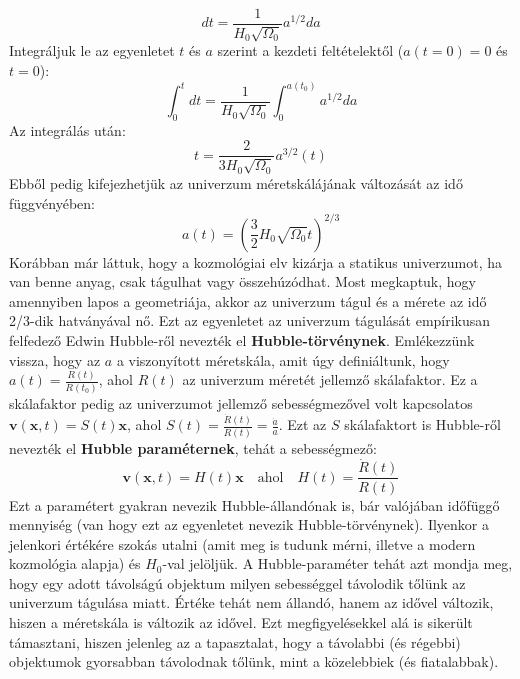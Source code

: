 \documentclass[../main.tex]{subfiles}
\begin{document}
\begin{equation}
    dt = \frac{1}{H_0 \sqrt{\Omega_0}} a^{1/2} d a
\end{equation}
Integráljuk le az egyenletet $t$ és $a$ szerint a kezdeti feltételektől ($a(t = 0) = 0$ és $t = 0$):
\begin{equation}
    \int_0^{t} d t = \frac{1}{H_0 \sqrt{\Omega_0}} \int_0^{a(t_0)} a^{1/2} d a
\end{equation}
Az integrálás után:
\begin{equation}
    t = \frac{2}{3 H_0 \sqrt{\Omega_0}} a^{3/2}(t)
\end{equation}
Ebből pedig kifejezhetjük az univerzum méretskálájának változását az idő függvényében:
\begin{equation}
    \boxed{a(t) = \left(\frac{3}{2} H_0 \sqrt{\Omega_0} t\right)^{2/3}}
\end{equation}
Korábban már láttuk, hogy a kozmológiai elv kizárja a statikus univerzumot, ha van benne anyag, csak tágulhat vagy összehúzódhat. Most megkaptuk, hogy amennyiben lapos a geometriája, akkor
az univerzum tágul és a mérete az idő 2/3-dik hatványával nő. Ezt az egyenletet az univerzum tágulását empírikusan felfedező Edwin Hubble-ről nevezték el \textbf{Hubble-törvénynek}. Emlékezzünk vissza,
hogy az $a$ a viszonyított méretskála, amit úgy definiáltunk, hogy $a(t) = \frac{R(t)}{R(t_0)}$, ahol $R(t)$ az univerzum méretét jellemző skálafaktor. Ez a skálafaktor pedig az univerzumot jellemző
sebességmezővel volt kapcsolatos $\mathbf{v}(\mathbf{x}, t) = S(t)\mathbf{x}$, ahol $S(t) = \frac{\dot{R}(t)}{R(t)} = \frac{\dot{a}}{a}$. Ezt az $S$ skálafaktort is Hubble-ről nevezték el \textbf{Hubble paraméternek}, tehát 
a sebességmező:
\begin{equation}
    \mathbf{v}(\mathbf{x}, t) = H(t) \mathbf{x} \quad \text{ahol} \quad H(t) = \frac{\dot{R}(t)}{R(t)}
\end{equation}
Ezt a paramétert gyakran nevezik Hubble-állandónak is, bár valójában időfüggő mennyiség (van hogy ezt az egyenletet nevezik Hubble-törvénynek). Ilyenkor a jelenkori értékére szokás utalni (amit meg is tudunk mérni, illetve a modern kozmológia alapja) és $H_0$-val jelöljük. 
A Hubble-paraméter tehát azt mondja meg, hogy egy adott távolságú objektum milyen sebességgel távolodik tőlünk az univerzum tágulása miatt. Értéke tehát nem állandó, hanem az idővel változik, hiszen a méretskála is változik az idővel.
Ezt megfigyelésekkel alá is sikerült támasztani, hiszen jelenleg az a tapasztalat, hogy a távolabbi (és régebbi) objektumok gyorsabban távolodnak tőlünk, mint a közelebbiek (és fiatalabbak).
\end{document}
